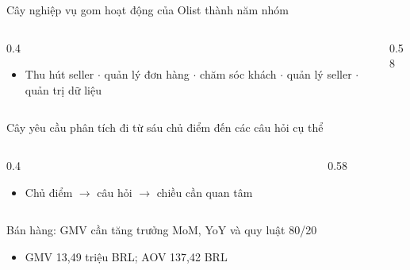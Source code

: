 \begin{frame}{Cây nghiệp vụ gom hoạt động của Olist thành năm nhóm}
\begin{columns}[T]\begin{column}{0.4\textwidth}
\begin{itemize}
  \item Thu hút seller $\cdot$ quản lý đơn hàng $\cdot$ chăm sóc khách $\cdot$ quản lý seller $\cdot$ quản trị dữ liệu
\end{itemize}
\end{column}\begin{column}{0.58\textwidth}
\begin{center}\end{center}
\end{column}\end{columns}

\end{frame}

\begin{frame}{Cây yêu cầu phân tích đi từ sáu chủ điểm đến các câu hỏi cụ thể}
\begin{columns}[T]\begin{column}{0.4\textwidth}
\begin{itemize}
  \item Chủ điểm $\rightarrow$ câu hỏi $\rightarrow$ chiều cần quan tâm
\end{itemize}
\end{column}\begin{column}{0.58\textwidth}
\begin{center}\end{center}
\end{column}\end{columns}

\end{frame}

\begin{frame}{Bán hàng: GMV cần tăng trưởng MoM, YoY và quy luật 80/20}
\begin{itemize}
  \item GMV 13,49 triệu BRL; AOV 137,42 BRL
\end{itemize}

\end{frame}

